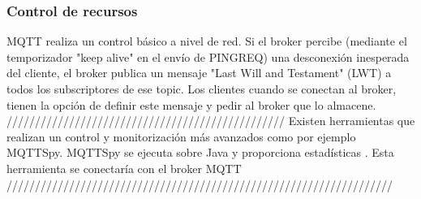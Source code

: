 \documentclass[12pt, twoside]{book}
\begin{document}
\subsubsection*{Control de recursos}
MQTT realiza un control básico a nivel de red. Si el broker percibe (mediante el temporizador "keep alive" en el envío de PINGREQ) una desconexión inesperada del cliente, el broker publica un mensaje "Last Will and Testament" (LWT) a todos los subscriptores de ese topic. Los clientes cuando se conectan al broker, tienen la opción de definir este mensaje y  pedir al broker que lo almacene.\\
/////////////////////////////////////////////////
Existen herramientas que realizan un control y monitorización más avanzados como por ejemplo MQTTSpy. MQTTSpy se ejecuta sobre Java y proporciona estadísticas . Esta herramienta se conectaría con el broker MQTT ////////////////////////////////////////////////////////////////////
\end{document}

